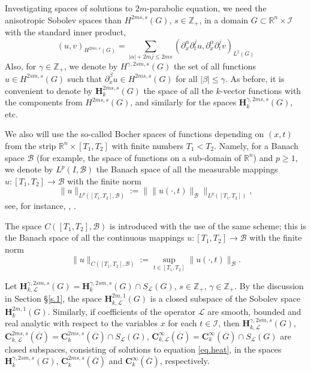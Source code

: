\documentclass{amsart}
\theoremstyle{definition}
\theoremstyle{remark}
\numberwithin{equation}{section}
\begin{document}
Investigating spaces of solutions to $2m$-parabolic equation, we need the 
anisotro\-pic Sobolev 
spaces than $H^{2ms,s} (G)$, $s \in  {\mathbb Z}_+$, in a domain $G\subset {\mathbb R}^{n} 
\times \mathcal{I}$ with the standard inner product,
$$
(u,v)_{H^{2ms,s} (G)} = \sum_{|\alpha|+2mj\leq 2ms} 
(\partial^\alpha_x \partial^j_t  u, \partial^\alpha_x \partial^j_t v)_{L^2 (G) }
$$ 
Also, for $\gamma \in {\mathbb Z}_+$, we denote by $H^{\gamma,2sm,s} (G)$ 
the set of all functions  $u \in H^{2sm,s} (G)$ such that 
 $\partial ^\beta_x u \in H^{2ms,s} (G)$ for all  $|\beta|\leq \gamma$.  
As before, it is convenient to denote by 
$\mathbf{H}^{2ms,s}_k (G)$ the space of all the $k$-vector functions with 
the components from ${H}^{2ms,s} (G)$, and similarly for the spaces
$\mathbf{H}^{\gamma, 2ms,s}_k (G)$, etc. 


We also will use the so-called Bocher spaces 
of functions depending on $(x,t)$ from the strip  
$\mathbb{R}^n \times  [T_1,T_2]$ with finite numbers $T_1<T_2$. 
Namely, for a Banach space $\mathcal B$ (for example, the space of functions 
on a sub-domain of $\mathbb{R}^n$) and    $p \geq 1$, we denote by  
$L^p (I,{\mathcal B})$ the Banach space of all the measurable mappings 
  $u : [T_1,T_2] \to {\mathcal B}$
with the finite norm  
$$
   \| u \|_{L^p ([T_1,T_2],{\mathcal B})}
 := \| \|  u (\cdot,t) \|_{\mathcal B} \|_{L^p ([T_1,T_2])},
$$
see, for instance, \cite[ch. \S 1.2]{Lion69},  \cite[ch.~III, \S~1]{Tema79}. 

The space $C ([T_1,T_2],{\mathcal B})$ is introduced with the use of the 
same scheme; this is the Banach space of all the continuous mappings
$u : [T_1,T_2] \to {\mathcal B}$ with the finite norm 
$$
   \| u \|_{C ([T_1,T_2],{\mathcal B})}
 := \sup_{t \in [T_1,T_2]} \| u (\cdot,t) \|_{\mathcal B}.
$$

Let ${\mathbf H}^{\gamma,2sm,s} _{k,\mathcal L}(G) =
\mathbf{H}^{\gamma,2sm,s}_k (G) \cap S _{\mathcal L}(G) $, 
$s \in  {\mathbb Z}_+$, $\gamma \in {\mathbb Z}_+$. 
By the discussion in Section \S \ref{s.1}, the space
${\mathbf H}^{2m,1} _{k,\mathcal L}(G)$ is a closed subspace of the Sobolev space 
$\mathbf{H}^{2m,1}_k(G)$. 
Similarly, if  coefficients of the operator $\mathcal L$ are smooth, 
bounded and real analytic with respect to the variables $x$ for each $t\in {\mathcal I}$,  
then ${\mathbf H}^{\gamma,2sm,s} _{k,\mathcal L}(G)$, ${\mathbf C}^{2ms,s} _{k,\mathcal L} 
(\overline{G}) = \mathbf{C}_k^{2ms,s} (\overline{G}) \cap S _{\mathcal L}(G) $, 
${\mathbf C}^{\infty} _{k,\mathcal L} (\overline{G}) =
\mathbf{C}_k^{\infty} (\overline{G}) \cap S _{\mathcal L}(G) $ 
are closed subspaces, consisting of solutions to equation \eqref{eq.heat}, in the spaces 
${\mathbf H}^{\gamma,2sm,s} _{k}(G)$, $\mathbf{C}^{2ms,s}_k  (\overline{G})$ and  
$\mathbf{C}^{\infty}_k  (\overline{G})$, respectively. 
\end{document}
